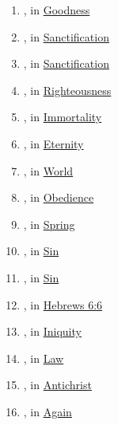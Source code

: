 	\begin{enumerate}
	
		\item \hyperref[AGATHOS]{}, in \hyperref[GOODNESS]{Goodness}
		
		\item \hyperref[HAGIAZO]{}, in \hyperref[SANCTIFICATION]{Sanctification}
		
		\item \hyperref[HAGIASMOS]{}, in \hyperref[SANCTIFICATION]{Sanctification}
	
		\item \hyperref[ADIKIA]{}, in \hyperref[RIGHTEOUSNESS]{Righteousness}
	
		\item \hyperref[ATHANASIA]{}, in \hyperref[IMMORTALITY]{Immortality}
		
		\item \hyperref[AIDIOS]{}, in \hyperref[ETERNITY]{Eternity}
		
		\item \hyperref[AION]{}, in \hyperref[WORLD]{World}
		
		\item \hyperref[AKOE]{}, in \hyperref[OBEDIENCE]{Obedience}
		
		\item \hyperref[HALLOMAI]{}, in \hyperref[SPRING]{Spring}
		
		\item \hyperref[HAMARTANO]{}, in \hyperref[SIN]{Sin}
		
		\item \hyperref[HAMARTIA]{}, in \hyperref[SIN]{Sin}
		
		\item \hyperref[ANASTAUROO]{}, in \hyperref[HEBREWS-6-6]{Hebrews 6:6}
		
		\item \hyperref[ANOMIA]{}, in \hyperref[INIQUITY]{Iniquity}
		
		\item \hyperref[ANOMOS-2]{}, in \hyperref[LAW]{Law}
		
		\item \hyperref[ANTI]{}, in \hyperref[ANTICHRIST]{Antichrist}
		
		\item \hyperref[ANOTHEN]{}, in \hyperref[AGAIN]{Again}
	

\end{enumerate}
